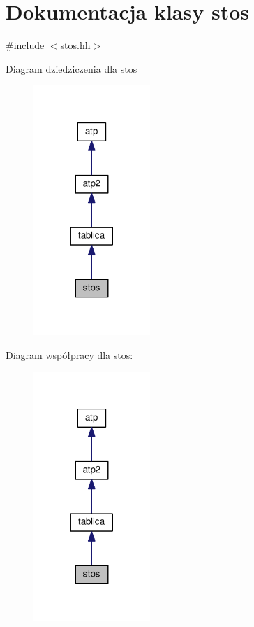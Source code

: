 \hypertarget{classstos}{}\section{Dokumentacja klasy stos}
\label{classstos}


{\ttfamily \#include $<$stos.\+hh$>$}



Diagram dziedziczenia dla stos\nopagebreak
\begin{figure}[H]
\begin{center}
\leavevmode
\includegraphics[width=125pt]{classstos__inherit__graph}
\end{center}
\end{figure}


Diagram współpracy dla stos\+:\nopagebreak
\begin{figure}[H]
\begin{center}
\leavevmode
\includegraphics[width=125pt]{classstos__coll__graph}
\end{center}
\end{figure}

